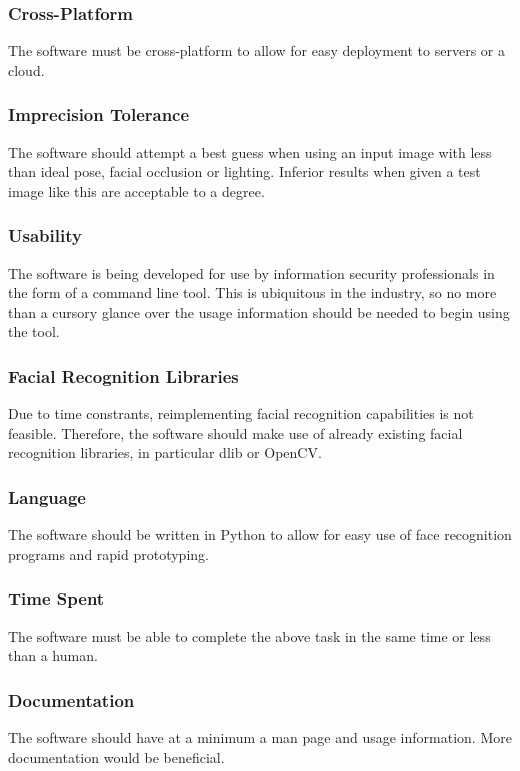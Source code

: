 \documentclass{article}
\begin{document}
\subsubsection{Cross-Platform}
The software must be cross-platform to allow for easy deployment to servers or a cloud.

\subsubsection{Imprecision Tolerance}
The software should attempt a best guess when using an input image with less than ideal pose, facial occlusion or lighting. Inferior results when given a test image like this are acceptable to a degree.

\subsubsection{Usability}
The software is being developed for use by information security professionals in the form of a command line tool. This is ubiquitous in the industry, so no more than a cursory glance over the usage information should be needed to begin using the tool.

\subsubsection{Facial Recognition Libraries}
Due to time constrants, reimplementing facial recognition capabilities is not feasible. Therefore, the software should make use of already existing facial recognition libraries, in particular dlib or OpenCV.

\subsubsection{Language}
The software should be written in Python to allow for easy use of face recognition programs and rapid prototyping.

\subsubsection{Time Spent}
The software must be able to complete the above task in the same time or less than a human.

\subsubsection{Documentation}
The software should have at a minimum a man page and usage information. More documentation would be beneficial.
\end{document}
